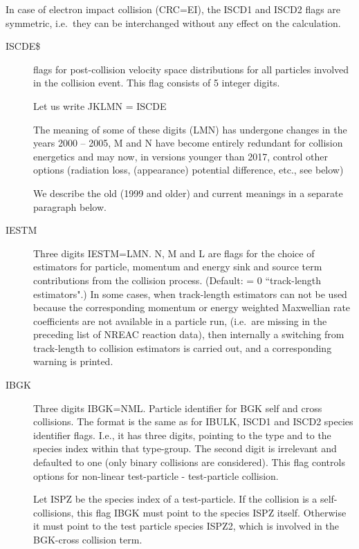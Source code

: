 In case of  electron impact collision (CRC=EI), the ISCD1 and ISCD2 flags are
symmetric, i.e.\ they can be interchanged without any effect on the
calculation.
\begin{description}
  \item[ISCDE\$] flags for post-collision velocity space distributions for all
        particles involved in the collision event.
        This flag consists of 5 integer digits.

        Let us write JKLMN = ISCDE

        The meaning of some of these digits (LMN) has undergone changes in the years
        2000 -- 2005, M and N have become entirely redundant for collision energetics
        and may now, in versions younger than 2017, control other options (radiation
        loss, (appearance) potential difference, etc., see below)

        We describe the old (1999 and older) and current meanings in a separate
        paragraph below.

  \item[IESTM] Three digits IESTM=LMN.
        N, M and L are flags for the choice of estimators for particle, momentum and
        energy sink and source term contributions from the collision process.
        (Default: = 0 ``track-length estimators".)
        In some cases, when track-length estimators can not be used because the
        corresponding momentum or energy weighted Maxwellian rate coefficients are not
        available in a particle run, (i.e.\ are missing in the preceding list of NREAC
        reaction data), then internally a switching from track-length to collision
        estimators is carried out, and a corresponding warning is printed.
  \item[IBGK]

        Three digits IBGK=NML.
        Particle identifier for \ac{BGK} self and cross collisions.
        The format is the same as for IBULK, ISCD1 and ISCD2 species identifier flags.
        I.e., it has three digits, pointing to the type and to the species index within
        that type-group.
        The second digit is irrelevant and defaulted to one (only binary collisions are
        considered).
        This flag controls options for non-linear test-particle - test-particle
        collision.

        Let ISPZ be the species index of a test-particle.
        If the collision is a self-collisions, this flag IBGK must point to the species
        ISPZ itself.
        Otherwise it must point to the  test particle species ISPZ2,
        which is involved in the \acs{BGK}-cross collision term.


\end{description}
